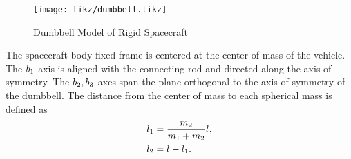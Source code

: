 \begin{figure}[htbp]
    \centering
    \texttt{[image: tikz/dumbbell.tikz]}
    \caption{Dumbbell Model of Rigid Spacecraft}
\end{figure}
The spacecraft body fixed frame is centered at the center of mass of the vehicle.
The \( b_{1} \)  axis is aligned with the connecting rod and directed along the axis of symmetry.
The \( b_{2}, b_{3} \) axes span the plane orthogonal to the axis of symmetry of the dumbbell.
The distance from the center of mass to each spherical mass is defined as
\begin{align}\label{eq:dumbbell_mass_distances}
    l_{1} &= \frac{m_{2}}{m_{1} + m_{2}} l_{}, \\
    l_{2} &= l_{} - l_{1}.
\end{align}

